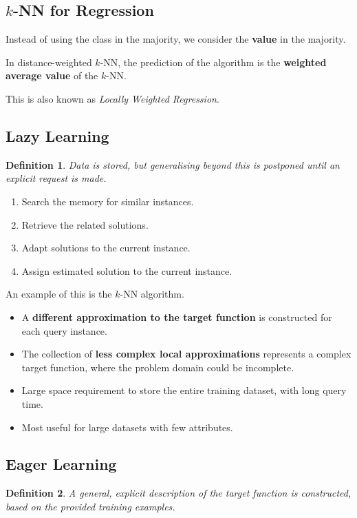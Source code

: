 \documentclass[11pt]{article}
\newtheorem{defn}{Definition}
\begin{document}
\subsection{$k$-NN for Regression}
Instead of using the class in the majority, we consider the \textbf{value} in the majority.

In distance-weighted $k$-NN, the prediction of the algorithm is the \textbf{weighted average value} of the $k$-NN.

This is also known as \textit{Locally Weighted Regression}.

\subsection{Lazy Learning}
\begin{defn}
Data is stored, but generalising beyond this is postponed until an explicit request is made.
\end{defn}

\begin{enumerate}
  \item Search the memory for similar instances.
  \item Retrieve the related solutions.
  \item Adapt solutions to the current instance.
  \item Assign estimated solution to the current instance.
\end{enumerate}

An example of this is the $k$-NN algorithm.

\begin{itemize}
  \item A \textbf{different approximation to the target function} is constructed for each query instance.
  \item The collection of \textbf{less complex local approximations} represents a complex target function, where the problem domain could be incomplete.
  \item Large space requirement to store the entire training dataset, with long query time.
  \item Most useful for large datasets with few attributes.
\end{itemize}

\subsection{Eager Learning}
\begin{defn}
  A general, explicit description of the target function is constructed, based on the provided training examples.
\end{defn}
\end{document}
